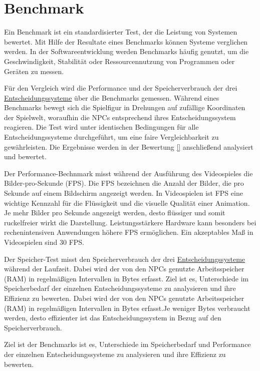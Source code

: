 \section{Benchmark}
\label{chap:benchmark}

Ein Benchmark ist ein standardisierter Test, der die Leistung von Systemen bewertet. Mit Hilfe der Resultate eines Benchmarks k\"{o}nnen Systeme verglichen werden. In der Softwareentwicklung werden Benchmarks h\"{a}ufig genutzt, um die Geschwindigkeit, Stabilit\"{a}t oder Ressourcennutzung von Programmen oder Ger\"{a}ten zu messen.

F\"{u}r den Vergleich wird die Performance und der Speicherverbrauch der drei \hyperref[chap:entscheidungssysteme]{Entscheidungssysteme} \"{u}ber die Benchmarks gemessen. W\"{a}hrend eines Benchmarks bewegt sich die Spielfigur in Drehungen auf zuf\"{a}llige Koordinaten der Spielwelt, woraufhin die NPCs entsprechend ihres Entscheidungssystem reagieren. Die Test wird unter identischen Bedingungen f\"{u}r alle Entscheidungssysteme durchgef\"{u}hrt, um eine faire Vergleichbarkeit zu gew\"{a}hrleisten. Die Ergebnisse werden in der Bewertung \ref{} anschlie\ss{}end analysiert und bewertet.

Der Performance-Bechnmark misst w\"{a}hrend der Ausf\"{u}hrung des Videospieles die Bilder-pro-Sekunde (FPS). Die FPS bezeichnen die Anzahl der Bilder, die pro Sekunde auf einem Bildschirm angezeigt werden. In Videospielen ist FPS eine wichtige Kennzahl f\"{u}r die Fl\"{u}ssigkeit und die visuelle Qualit\"{a}t einer Animation. Je mehr Bilder pro Sekunde angezeigt werden, desto fl\"{u}ssiger und somit ruckelfreier wirkt die Darstellung. Leistungsst\"{a}rkere Hardware kann besonders bei rechenintensiven Anwendungen h\"{o}here FPS erm\"{o}glichen. Ein akzeptables Ma\ss{} in Videospielen sind 30 FPS.

Der Speicher-Test misst den Speicherverbrauch der drei \hyperref[chap:entscheidungssysteme]{Entscheidungssysteme} w\"{a}hrend der Laufzeit. Dabei wird der von den NPCs genutzte Arbeitsspeicher (RAM) in regelm\"{a}\ss{}igen Intervallen in Bytes erfasst. Ziel ist es, Unterschiede im Speicherbedarf der einzelnen Entscheidungssysteme zu analysieren und ihre Effizienz zu bewerten. Dabei wird der von den NPCs genutzte Arbeitsspeicher (RAM) in regelm\"{a}\ss{}igen Intervallen in Bytes erfasst.Je weniger Bytes verbraucht werden, desto effizienter ist das Entscheidungssystem in Bezug auf den Speicherverbrauch.

Ziel ist der Benchmarks ist es, Unterschiede im Speicherbedarf und Performance der einzelnen Entscheidungssysteme zu analysieren und ihre Effizienz zu bewerten.